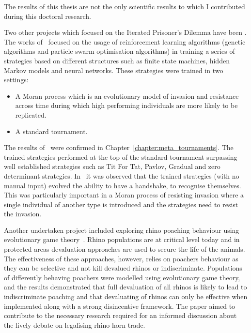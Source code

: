 The results of this thesis are not the only scientific results to which I contributed during this doctoral research.

Two other projects which focused on the Iterated
Prisoner's Dilemma have been
\cite{Knight2017, Harper2017}. The works of~\cite{Knight2017, Harper2017}
focused on the usage of reinforcement learning algorithms (genetic algorithms
and particle swarm optimisation algorithms) in training a series of strategies
based on different structures such as finite state machines, hidden Markov
models and neural networks. These strategies were trained in two settings:

\begin{itemize}
    \item A Moran process which is an evolutionary model of invasion and
    resistance across time during which high performing individuals are more
    likely to be replicated.
    \item A standard tournament.
\end{itemize}

The results of~\cite{Knight2017} were confirmed in
Chapter~\ref{chapter:meta_tournaments}. The trained strategies performed at
the top of the standard tournament surpassing well established
strategies such as Tit For Tat, Pavlov, Gradual and zero determinant strategies.
In~\cite{Harper2017} it was observed that the trained strategies (with no manual
input) evolved the ability to have a handshake, to recognise themselves. This
was particularly important in a Moran process of resisting invasion where a
single individual of another type is introduced and the strategies need to
resist the invasion.

Another undertaken project included exploring rhino poaching behaviour using
evolutionary game theory~\cite{Glynatsi2018}. Rhino populations are at critical
level today and in protected areas devaluation approaches are used to secure the
life of the animals. The effectiveness of these approaches, however, relies on
poachers behaviour as they can be selective and not kill devalued rhinos or
indiscriminate. Populations of differently behaving poachers were modelled using
evolutionary game theory, and the results
demonstrated that full devaluation of all rhinos is likely to lead to
indiscriminate poaching and that devaluating of rhinos can only be effective
when implemented along with a strong disincentive framework. The paper aimed to
contribute to the necessary research required for an informed discussion about
the lively debate on legalising rhino horn trade.

